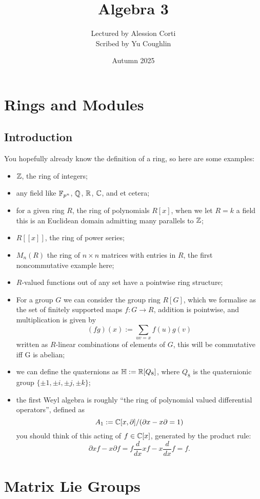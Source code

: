 \documentclass{article}
\begin{document}
\title{Algebra 3}
\author{Lectured by Alession Corti \\
Scribed by Yu Coughlin}
\date{Autumn 2025}

\maketitle

\tableofcontents

\section{Rings and Modules}

\subsection{Introduction}
You hopefully already know the definition of a ring, so here are some examples:
\begin{itemize}
    \item $\mathbb{Z}$, the ring of integers;
    \item any field like $\mathbb{F}_{p^n}$, $\mathbb{Q}$, $\mathbb{R}$, $\mathbb{C}$, and et cetera;
    \item for a given ring $R$, the ring of polynomials $R[x]$, when we let $R=k$ a field this is an Euclidean domain admitting many parallels to $\mathbb{Z}$;
    \item $R[[x]]$, the ring of power series;
    \item $M_n(R)$ the ring of $n\times n$ matrices with entries in $R$, the first noncommutative example here;
    \item $R$-valued functions out of any set have a pointwise ring structure;
    \item For a group $G$ we can consider the group ring $R[G]$, which we formalise as the set of finitely supported maps $f:G \rightarrow R$, addition is pointwise, and multiplication is given by \[
    (fg)(x) := \sum_{uv=x}f(u)g(v)
    \]
    written as $R$-linear combinations of elements of $G$, this will be commutative iff G is abelian;
    \item we can define the quaternions as $\mathbb{H}:= \mathbb{R}[Q_8]$, where $Q_8$ is the quaternionic group $\{\pm 1,\pm i, \pm j,\pm k\}$;
    \item the first Weyl algebra is roughly ``the ring of polynomial valued differential operators'', defined as \[
        A_1 := \mathbb{C}[x,\partial] / (\partial x - x \partial = 1)
    \] you should think of this acting of $f\in \mathbb{C}[x]$, generated by the product rule: \[
    \partial xf - x\partial f = f\frac{d}{dx}xf - x\frac{d}{dx}f = f.
    \]
\end{itemize}
\section{Matrix Lie Groups}
\end{document}
